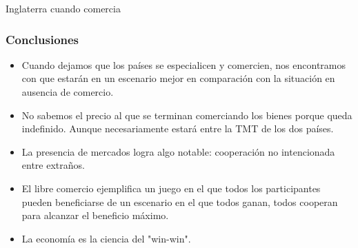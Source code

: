 \documentclass{beamer}
\begin{document}
\begin{frame}{Inglaterra cuando comercia}
\begin{figure}[h]
    \end{figure}
\end{frame}

\begin{frame}
    \frametitle{Conclusiones}
    \begin{itemize}
        \item Cuando dejamos que los países se especialicen y comercien, nos encontramos con que estarán en un escenario mejor en comparación con la situación en ausencia de comercio.
        \item No sabemos el precio al que se terminan comerciando los bienes porque queda indefinido. Aunque necesariamente estará entre la TMT de los dos países.
        \item La presencia de mercados logra algo notable: cooperación no intencionada entre extraños.
        \item El libre comercio ejemplifica un juego en el que todos los participantes pueden beneficiarse de un escenario en el que todos ganan, todos cooperan para alcanzar el beneficio máximo.
        \item La economía es la ciencia del "win-win".
    \end{itemize}
\end{frame}
\end{document}
